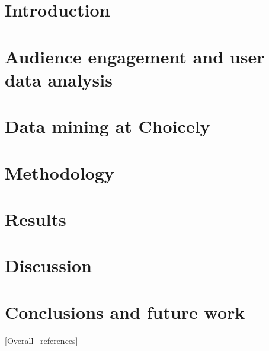 \documentclass[english]{tktltiki}
\begin{document}
\mytableofcontents

	\section{Introduction}
	\label{section::introduction}
	
	
	\section{Audience engagement and user data analysis}
	\label{section::audience-engagement-and-user-data-analysis}
		
	
	\section{Data mining at Choicely}
	\label{section::data-mining-at-choicely}
	
	
	\section{Methodology}
	\label{section::methodology}
	

	\section{Results}
	\label{section::results}
	

	\section{Discussion}
	\label{section::discussion}
	

	\section{Conclusions and future work}
	\label{section::conclusions}
	    

\pagebreak

[Overall \ references]

\nocite{*}



\lastpage
\appendices
\pagestyle{empty}

%
%
\end{document}

